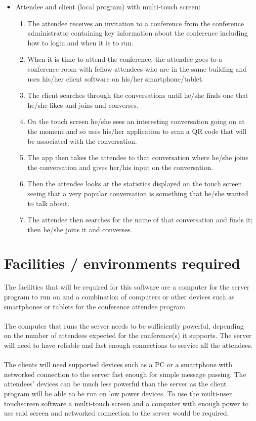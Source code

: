 \documentclass[12p, a4paper, onecolumn]{report}
\begin{document}
\begin {itemize}
\item{Attendee and client (local program) with multi-touch screen:
\begin{enumerate}
\item The attendee receives an invitation to a conference from the conference administrator containing key information about the conference including how to login and when it is to run.
\item When it is time to attend the conference, the attendee goes to a conference room with fellow attendees who are in the same building and uses his/her client software on his/her smartphone/tablet.
\item The client searches through the conversations until he/she finds one that he/she likes and joins and converses.
\item On the touch screen he/she sees an interesting conversation going on at the moment and so uses his/her application to scan a QR code that will be associated with the conversation.
\item The app then takes the attendee to that conversation where he/she joins the conversation and gives her/his input on the conversation.
\item Then the attendee looks at the statistics displayed on the touch screen seeing that a very popular conversation is something that he/she wanted to talk about.
\item The attendee then searches for the name of that conversation and finds it; then he/she joins it and converses.
\end{enumerate}}
\end{itemize}

\section{Facilities / environments required}

The facilities that will be required for this software are a computer for the server program to run on and a combination of computers or other devices such as smartphones or tablets for the conference attendee program. \\ \\
The computer that runs the server needs to be sufficiently powerful, depending on the number of attendees expected for the conference(s) it supports. The server will need to have reliable and fast enough connections to service all the attendees. \\ \\
The clients will need supported devices such as a PC or a smartphone with networked connection to the server fast enough for simple message passing. The attendees' devices can be much less powerful than the server as the client program will be able to be run on low power devices. To use the multi-user touchscreen software a multi-touch screen and a computer with enough power to use said screen and networked connection to the server would be required.
\end{document}
